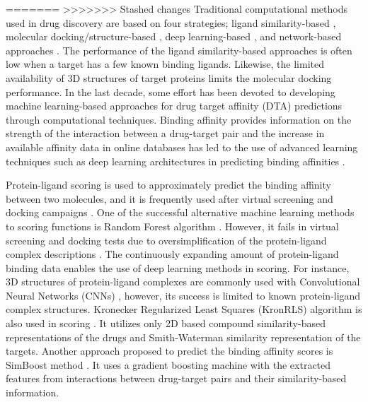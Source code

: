 =======
>>>>>>> Stashed changes
Traditional computational methods used in drug discovery are based on four strategies; ligand similarity-based \cite{keiser2007relating}, molecular docking/structure-based \cite{morris2009autodock4,donald2011algorithms}, deep learning-based \cite{wan2018neodti, luo2017network}, and network-based approaches \cite{luo2017network, zheng2013collaborative, chen2012drug, wang2014drug}. The performance of the ligand similarity-based approaches is often low when a target has a few known binding ligands. Likewise, the limited availability of 3D structures of target proteins limits the molecular docking performance. In the last decade, some effort has been devoted to developing machine learning-based approaches for drug target affinity (DTA) predictions through computational techniques. Binding affinity provides information on the strength of the interaction between a drug-target pair and the increase in available affinity data in online databases has led to the use of advanced learning techniques such as deep learning architectures in predicting binding affinities \cite{chan2016large, tian2016boosting, hamanaka2017cgbvs}.

Protein-ligand scoring is used to approximately predict the binding affinity between two molecules, and it is frequently used after virtual screening and docking campaigns \cite{ragoza2017protein}. One of the successful alternative machine learning methods to scoring functions is Random Forest algorithm \cite{ballester2010machine, shar2016pred}. However, it fails in virtual screening and docking tests due to oversimplification of the protein-ligand complex descriptions \cite{gabel2014beware}. The continuously expanding amount of protein-ligand binding data enables the use of deep learning methods in scoring. For instance, 3D structures of protein-ligand complexes are commonly used with Convolutional Neural Networks (CNNs) \cite{gomes2017atomic, ragoza2017protein, wallach2015atomnet}, however, its success is limited to known protein-ligand complex structures. Kronecker Regularized Least Squares (KronRLS) algorithm is also used in scoring \cite{pahikkala2014toward}. It utilizes only 2D based compound similarity-based representations of the drugs and Smith-Waterman similarity representation of the targets. Another approach proposed to predict the binding affinity scores is SimBoost method \cite{he2017simboost}. It uses a gradient boosting machine with the extracted features from interactions between drug-target pairs and their similarity-based information. 

